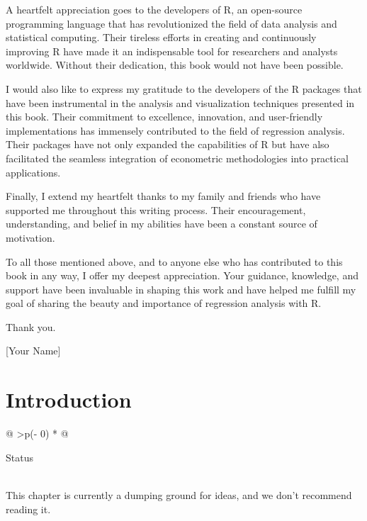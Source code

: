 \documentclass[
  letterpaper,
  paper =a4,
  twoside,
  openright,
  headsepline,
  footsepline,
  listof = totocnumbered,
  chapterprefix = true,
  firstiscover,
  parskip = full*]{scrbook}
\begin{document}
A heartfelt appreciation goes to the developers of R, an open-source
programming language that has revolutionized the field of data analysis
and statistical computing. Their tireless efforts in creating and
continuously improving R have made it an indispensable tool for
researchers and analysts worldwide. Without their dedication, this book
would not have been possible.

I would also like to express my gratitude to the developers of the R
packages that have been instrumental in the analysis and visualization
techniques presented in this book. Their commitment to excellence,
innovation, and user-friendly implementations has immensely contributed
to the field of regression analysis. Their packages have not only
expanded the capabilities of R but have also facilitated the seamless
integration of econometric methodologies into practical applications.

Finally, I extend my heartfelt thanks to my family and friends who have
supported me throughout this writing process. Their encouragement,
understanding, and belief in my abilities have been a constant source of
motivation.

To all those mentioned above, and to anyone else who has contributed to
this book in any way, I offer my deepest appreciation. Your guidance,
knowledge, and support have been invaluable in shaping this work and
have helped me fulfill my goal of sharing the beauty and importance of
regression analysis with R.

Thank you.

{[}Your Name{]}


\chapter{Introduction}\label{introduction}

\begin{longtable}[]{@{}
  >{\centering\arraybackslash}p{(\columnwidth - 0\tabcolsep) * }@{}}
\toprule\noalign{}
\begin{minipage}[b]{\linewidth}\centering
Status
\end{minipage} \\
\midrule\noalign{}
\endhead
\bottomrule\noalign{}
\endlastfoot
This chapter is currently a dumping ground for ideas, and we don't
recommend reading it. \\
\end{longtable}
\end{document}
